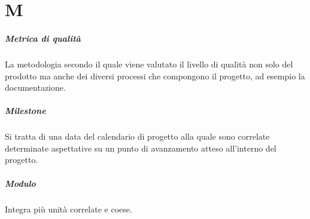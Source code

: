 \chapter{M}
\paragraph*{Metrica di qualità}
La metodologia secondo il quale viene valutato il livello di qualità non solo del prodotto ma anche dei diversi processi che compongono il progetto, ad esempio la documentazione.

\paragraph*{Milestone}
Si tratta di una data del calendario di progetto alla quale sono correlate determinate aspettative su un punto di avanzamento atteso all'interno del progetto.

\paragraph*{Modulo}
Integra più unità correlate e coese.